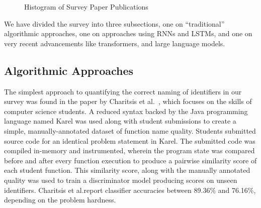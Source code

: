 \documentclass[conference]{IEEEtran}
\begin{document}
\begin{figure}[h!]

    \caption{Histogram of Survey Paper Publications}
    \label{fig:Histogram-of-Survey-Paper-Publications}
\end{figure}

We have divided the survey into three subsections, one on ``traditional'' algorithmic
approaches, one on approaches using RNNs and LSTMs, and one on very recent advancements
like transformers, and large language models.

\subsection{Algorithmic Approaches}
\label{ssec:Algorithmic-Approaches}

The simplest approach to quantifying the correct naming of identifiers in our survey was
found in the paper by Charitsis et al.\@~\cite{Charitsis2021Assessing}, which focuses on
the skills of computer science students. A reduced syntax backed by the Java programming
language named Karel was used along with student submissions to create a simple,
manually-annotated dataset of function name quality. Students submitted source code for an
identical problem statement in Karel. The submitted code was compiled in-memory and
instrumented, wherein the program state was compared before and after every function
execution to produce a pairwise similarity score of each student function. This similarity
score, along with the manually annotated quality was used to train a discriminator model
producing scores on unseen identifiers. Charitsis et al.\@ report classifier accuracies
between 89.36\% and 76.16\%, depending on the problem hardness.
\end{document}
